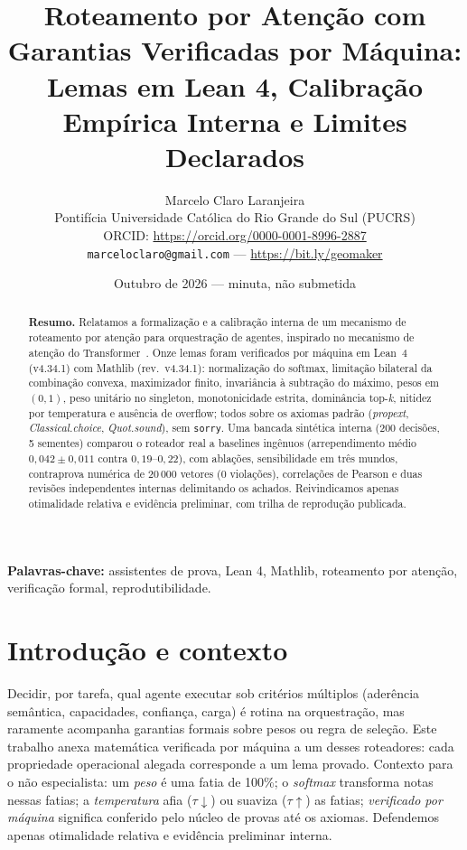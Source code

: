 \documentclass[11pt,a4paper]{article}
\title{Roteamento por Atenção com Garantias Verificadas por Máquina:\\Lemas em Lean 4, Calibração Empírica Interna e Limites Declarados}
\author{Marcelo Claro Laranjeira\\Pontifícia Universidade Católica do Rio Grande do Sul (PUCRS)\\ORCID: \url{https://orcid.org/0000-0001-8996-2887}\\ \texttt{marceloclaro@gmail.com} --- \url{https://bit.ly/geomaker}}
\date{Outubro de 2026 --- minuta, não submetida}
\theoremstyle{definition}
\begin{document}
\maketitle
\begin{abstract}
\textbf{Resumo.} Relatamos a formalização e a calibração interna de um mecanismo de roteamento por atenção para orquestração de agentes, inspirado no mecanismo de atenção do Transformer~\cite{vaswani2017}. Onze lemas foram verificados por máquina em Lean~4 (v4.34.1) com Mathlib (rev.\ v4.34.1): normalização do softmax, limitação bilateral da combinação convexa, maximizador finito, invariância à subtração do máximo, pesos em $(0,1)$, peso unitário no singleton, monotonicidade estrita, dominância top-\textit{k}, nitidez por temperatura e ausência de overflow; todos sobre os axiomas padrão (\textit{propext}, \textit{Classical.choice}, \textit{Quot.sound}), sem \texttt{sorry}. Uma bancada sintética interna (200 decisões, 5 sementes) comparou o roteador real a baselines ingênuos (arrependimento médio $0{,}042\pm0{,}011$ contra $0{,}19$--$0{,}22$), com ablações, sensibilidade em três mundos, contraprova numérica de 20\,000 vetores (0 violações), correlações de Pearson e duas revisões independentes internas delimitando os achados. Reivindicamos apenas otimalidade relativa e evidência preliminar, com trilha de reprodução publicada.
\end{abstract}
\noindent\textbf{Palavras-chave:} assistentes de prova, Lean 4, Mathlib, roteamento por atenção, verificação formal, reprodutibilidade.
\section{Introdução e contexto}
Decidir, por tarefa, qual agente executar sob critérios múltiplos (aderência semântica, capacidades, confiança, carga) é rotina na orquestração, mas raramente acompanha garantias formais sobre pesos ou regra de seleção. Este trabalho anexa matemática verificada por máquina a um desses roteadores: cada propriedade operacional alegada corresponde a um lema provado. Contexto para o não especialista: um \textit{peso} é uma fatia de 100\%; o \textit{softmax} transforma notas nessas fatias; a \textit{temperatura} afia ($\tau\!\downarrow$) ou suaviza ($\tau\!\uparrow$) as fatias; \textit{verificado por máquina} significa conferido pelo núcleo de provas até os axiomas. Defendemos apenas otimalidade relativa e evidência preliminar interna.
\end{document}
